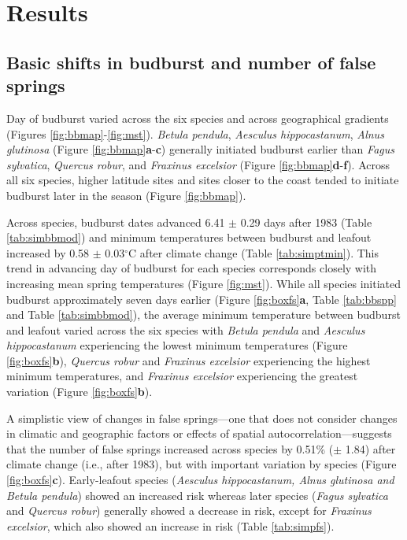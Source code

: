 \documentclass{article}\usepackage[]{graphicx}\usepackage[]{color}
\begin{document}
\section*{Results} %
\subsection*{Basic shifts in budburst and number of false springs}
Day of budburst varied across the six species and across geographical gradients (Figures \ref{fig:bbmap}-\ref{fig:mst}). \textit{Betula pendula}, \textit{Aesculus hippocastanum}, \textit{Alnus glutinosa} (Figure \ref{fig:bbmap}\textbf{a}-\textbf{c}) generally initiated budburst earlier than \textit{Fagus sylvatica}, \textit{Quercus robur}, and \textit{Fraxinus excelsior} (Figure \ref{fig:bbmap}\textbf{d}-\textbf{f}). Across all six species, higher latitude sites and sites closer to the coast tended to initiate budburst later in the season (Figure \ref{fig:bbmap}).  

Across species, budburst dates advanced 6.41 $\pm$ 0.29 days after 1983 (Table \ref{tab:simbbmod}) and minimum temperatures between budburst and leafout increased by 0.58 $\pm$ 0.03$^{\circ}$C after climate change (Table \ref{tab:simptmin}). This trend in advancing day of budburst for each species corresponds closely with increasing mean spring temperatures (Figure \ref{fig:mst}). While all species initiated budburst approximately seven days earlier (Figure \ref{fig:boxfs}\textbf{a}, Table \ref{tab:bbspp} and Table \ref{tab:simbbmod}), the average minimum temperature between budburst and leafout varied across the six species with \textit{Betula pendula} and \textit{Aesculus hippocastanum} experiencing the lowest minimum temperatures (Figure \ref{fig:boxfs}\textbf{b}), \textit{Quercus robur} and \textit{Fraxinus excelsior} experiencing the highest minimum temperatures, and \textit{Fraxinus excelsior} experiencing the greatest variation (Figure \ref{fig:boxfs}\textbf{b}). 

A simplistic view of changes in false springs---one that does not consider changes in climatic and geographic factors or effects of spatial autocorrelation---suggests that the number of false springs increased across species by 0.51\% ($\pm$ 1.84) after climate change (i.e., after 1983), but with important variation by species (Figure \ref{fig:boxfs}\textbf{c}). Early-leafout species (\textit{Aesculus hippocastanum, \textit{Alnus glutinosa} and \textit{Betula pendula}}) showed an increased risk whereas later species (\textit{Fagus sylvatica} and \textit{Quercus robur}) generally showed a decrease in risk, except for \textit{Fraxinus excelsior}, which also showed an increase in risk (Table \ref{tab:simpfs}). 
\end{document}
